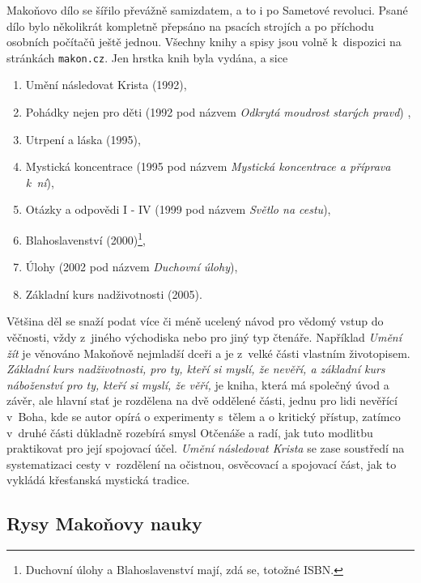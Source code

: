 Makoňovo dílo se šířilo převážně samizdatem, a to i po
Sametové revoluci. Psané dílo bylo několikrát kompletně přepsáno na
psacích strojích a po příchodu osobních počítačů ještě jednou. Všechny knihy a
spisy jsou volně k~dispozici na stránkách \texttt{makon.cz}. Jen hrstka knih
byla vydána, a sice
\begin{enumerate}
\item{Umění následovat Krista (1992)\cite{makon1995umeni},}
\item{
    Pohádky nejen pro děti (1992 pod názvem {\em Odkrytá moudrost starých
    pravd}) \cite{makon1992odkryta},
}
\item{Utrpení a láska (1995)\cite{makon1995utrpeni},}
\item{
    Mystická koncentrace (1995 pod názvem
    {\em Mystická koncentrace a příprava k~ní})\cite{makon1995mysticka},
}
\item{
    Otázky a odpovědi I - IV (1999 pod názvem {\em Světlo na cestu})\cite{makon1999svetlo},
}
\item{
    Blahoslavenství
    (2000)\cite{makon2000blahoslavenstvi}\footnote{\label{note1}
        Duchovní úlohy a Blahoslavenství mají, zdá se, totožné ISBN.
    },
}
\item{
    Úlohy (2002 pod názvem {\em Duchovní
    úlohy})\cite{makon2002ulohy},
}
\item{Základní kurs nadživotnosti (2005)\cite{makon2005zakladni}.}
\end{enumerate}

Většina děl se snaží podat více či méně ucelený návod pro vědomý vstup do
věčnosti, vždy z~jiného východiska nebo pro jiný typ čtenáře. Například {\em Umění
žít} je věnováno Makoňově nejmladší dceři a je z~velké části vlastním
životopisem. {\em Základní kurs nadživotnosti, pro ty, kteří si myslí, že nevěří, a
základní kurs náboženství pro ty, kteří si myslí, že věří,} je kniha, která má
společný úvod a závěr, ale hlavní stať je rozdělena na dvě oddělené části, jednu
pro lidi nevěřící v~Boha, kde se autor opírá o experimenty s~tělem a o kritický
přístup, zatímco v~druhé části důkladně rozebírá smysl Otčenáše a radí,
jak tuto modlitbu praktikovat pro její spojovací účel. {\em Umění následovat
Krista} se zase soustředí na systematizaci cesty v~rozdělení na očistnou,
osvěcovací a spojovací část, jak to vykládá křesťanská mystická tradice.

\subsection{Rysy Makoňovy nauky}

